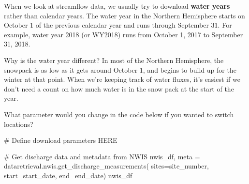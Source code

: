 \documentclass[
  letterpaper,
  DIV=11,
  numbers=noendperiod,
  oneside]{scrreprt}
\newenvironment{Shaded}{\begin{snugshade}}{\end{snugshade}}
\newcommand{\CommentTok}[1]{\textcolor[rgb]{0.37,0.37,0.37}{#1}}
\newcommand{\NormalTok}[1]{\textcolor[rgb]{0.00,0.23,0.31}{#1}}
\newcommand{\OperatorTok}[1]{\textcolor[rgb]{0.37,0.37,0.37}{#1}}
\begin{document}
\begin{tcolorbox}[enhanced jigsaw, colbacktitle=quarto-callout-tip-color!10!white, opacityback=0, bottomtitle=1mm, toptitle=1mm, bottomrule=.15mm, left=2mm, colframe=quarto-callout-tip-color-frame, leftrule=.75mm, opacitybacktitle=0.6, colback=white, rightrule=.15mm, toprule=.15mm, breakable, titlerule=0mm, title=\textcolor{quarto-callout-tip-color}{\faLightbulb}\hspace{0.5em}{Water Years}, coltitle=black, arc=.35mm]

When we look at streamflow data, we usually try to download
\textbf{water years} rather than calendar years. The water year in the
Northern Hemisphere starts on October 1 of the previous calendar year
and runs through September 31. For example, water year 2018 (or WY2018)
runs from October 1, 2017 to September 31, 2018.

Why is the water year different? In most of the Northern Hemisphere, the
snowpack is as low as it gets around October 1, and begins to build up
for the winter at that point. When we're keeping track of water fluxes,
it's easiest if we don't need a count on how much water is in the snow
pack at the start of the year.

\end{tcolorbox}

\begin{tcolorbox}[enhanced jigsaw, colbacktitle=quarto-callout-color!10!white, opacityback=0, bottomtitle=1mm, toptitle=1mm, bottomrule=.15mm, left=2mm, colframe=quarto-callout-color-frame, leftrule=.75mm, opacitybacktitle=0.6, colback=white, rightrule=.15mm, toprule=.15mm, breakable, titlerule=0mm, title=\textcolor{quarto-callout-color}{\faInfo}\hspace{0.5em}{Reflect and Respond}, coltitle=black, arc=.35mm]

What parameter would you change in the code below if you wanted to
switch locations?

\end{tcolorbox}

\begin{Shaded}
\begin{Highlighting}[]
\CommentTok{\# Define download parameters HERE}

\CommentTok{\# Get discharge data and metadata from NWIS}
\NormalTok{nwis\_df, meta }\OperatorTok{=}\NormalTok{ dataretrieval.nwis.get\_discharge\_measurements(}
\NormalTok{    sites}\OperatorTok{=}\NormalTok{site\_number,}
\NormalTok{    start}\OperatorTok{=}\NormalTok{start\_date,}
\NormalTok{    end}\OperatorTok{=}\NormalTok{end\_date)}
\NormalTok{nwis\_df}
\end{Highlighting}
\end{Shaded}
\end{document}

